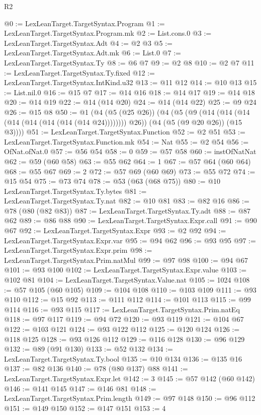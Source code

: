\begin{lexlean}{R2}
\begin{coremodule}
@0 := LexLeanTarget.TargetSyntax.Program
@1 := LexLeanTarget.TargetSyntax.Program.mk
@2 := List.cons.{0}
@3 := LexLeanTarget.TargetSyntax.Adt
@4 := @2 @3
@5 := LexLeanTarget.TargetSyntax.Adt.mk
@6 := List.{0}
@7 := LexLeanTarget.TargetSyntax.Ty
@8 := @6 @7
@9 := @2 @8
@10 := @2 @7
@11 := LexLeanTarget.TargetSyntax.Ty.fixed
@12 := LexLeanTarget.TargetSyntax.IntKind.u32
@13 := @11 @12
@14 := @10 @13
@15 := List.nil.{0}
@16 := @15 @7
@17 := @14 @16
@18 := @14 @17
@19 := @14 @18
@20 := @14 @19
@22 := @14 (@14 @20)
@24 := @14 (@14 @22)
@25 := @9 @24
@26 := @15 @8
@50 := @1
    (@4
      (@5 (@25 @26))
      (@4
        (@5 (@9 (@14 (@14 (@14 (@14 (@14 (@14 (@14 (@14 @24)))))))) @26))
        (@4 (@5 (@9 @20 @26)) (@15 @3))))
@51 := LexLeanTarget.TargetSyntax.Function
@52 := @2 @51
@53 := LexLeanTarget.TargetSyntax.Function.mk
@54 := Nat
@55 := @2 @54
@56 := OfNat.ofNat.{0}
@57 := @56 @54
@58 := 0
@59 := @57 @58
@60 := instOfNatNat
@62 := @59 (@60 @58)
@63 := @55 @62
@64 := 1
@67 := @57 @64 (@60 @64)
@68 := @55 @67
@69 := 2
@72 := @57 @69 (@60 @69)
@73 := @55 @72
@74 := @15 @54
@75 := @73 @74
@78 := @53 (@63 (@68 @75))
@80 := @10 LexLeanTarget.TargetSyntax.Ty.bytes
@81 := LexLeanTarget.TargetSyntax.Ty.nat
@82 := @10 @81
@83 := @82 @16
@86 := @78 (@80 (@82 @83))
@87 := LexLeanTarget.TargetSyntax.Ty.adt
@88 := @87 @62
@89 := @86 @88
@90 := LexLeanTarget.TargetSyntax.Expr.call
@91 := @90 @67
@92 := LexLeanTarget.TargetSyntax.Expr
@93 := @2 @92
@94 := LexLeanTarget.TargetSyntax.Expr.var
@95 := @94 @62
@96 := @93 @95
@97 := LexLeanTarget.TargetSyntax.Expr.prim
@98 := LexLeanTarget.TargetSyntax.Prim.natMul
@99 := @97 @98
@100 := @94 @67
@101 := @93 @100
@102 := LexLeanTarget.TargetSyntax.Expr.value
@103 := @102 @81
@104 := LexLeanTarget.TargetSyntax.Value.nat
@105 := 1024
@108 := @57 @105 (@60 @105)
@109 := @104 @108
@110 := @103 @109
@111 := @93 @110
@112 := @15 @92
@113 := @111 @112
@114 := @101 @113
@115 := @99 @114
@116 := @93 @115
@117 := LexLeanTarget.TargetSyntax.Prim.natEq
@118 := @97 @117
@119 := @94 @72
@120 := @93 @119
@121 := @104 @67
@122 := @103 @121
@124 := @93 @122 @112
@125 := @120 @124
@126 := @118 @125
@128 := @93 @126 @112
@129 := @116 @128
@130 := @96 @129
@132 := @89 (@91 @130)
@133 := @52 @132
@134 := LexLeanTarget.TargetSyntax.Ty.bool
@135 := @10 @134
@136 := @135 @16
@137 := @82 @136
@140 := @78 (@80 @137) @88
@141 := LexLeanTarget.TargetSyntax.Expr.let
@142 := 3
@145 := @57 @142 (@60 @142)
@146 := @141 @145
@147 := @146 @81
@148 := LexLeanTarget.TargetSyntax.Prim.length
@149 := @97 @148
@150 := @96 @112
@151 := @149 @150
@152 := @147 @151
@153 := 4

\end{coremodule}
\end{lexlean}
